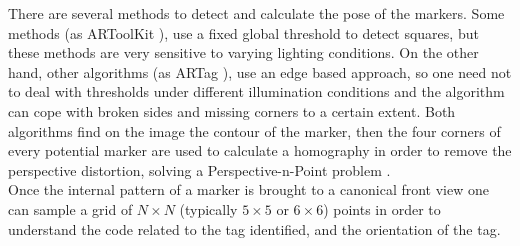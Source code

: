 There are several methods to detect and calculate the pose of the markers. Some methods (as ARToolKit \cite{kato1999marker}), use a fixed global threshold to detect squares, but these methods are very sensitive to varying lighting conditions. On the other hand, other algorithms (as ARTag \cite{fiala2010designing}), use an edge based approach, so one need not to deal with thresholds under different illumination conditions and the algorithm can cope with broken sides and missing corners to a certain extent. 
Both algorithms find on the image the contour of the marker, then the four corners of every potential marker are used to calculate a homography in order to remove the perspective distortion, solving a Perspective-n-Point problem \cite{quan1999linear}.\\
Once the internal pattern of a marker is brought to a canonical front view one can sample a grid of $N \times N$ (typically $5 \times 5$ or $6 \times 6$) points in order to understand the code related to the tag identified, and the orientation of the tag.

